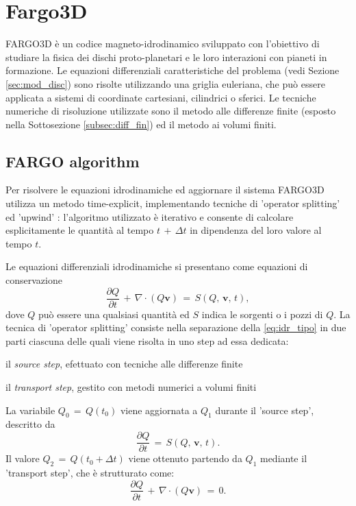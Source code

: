\section{Fargo3D}

FARGO3D è un codice magneto-idrodinamico sviluppato con l'obiettivo di studiare la fisica dei dischi proto-planetari e le loro interazioni con pianeti in formazione. Le equazioni differenziali caratteristiche del problema (vedi Sezione \ref{sec:mod_disc}) sono risolte utilizzando una griglia euleriana, che può essere applicata a sistemi di coordinate cartesiani, cilindrici o sferici. Le tecniche numeriche di risoluzione utilizzate sono il metodo alle differenze finite (esposto nella Sottosezione \ref{subsec:diff_fin}) ed il metodo ai volumi finiti.

\subsection{FARGO algorithm} \label{subsec:Fargo_al}

Per risolvere le equazioni idrodinamiche ed aggiornare il sistema FARGO3D utilizza un metodo time-explicit, implementando tecniche di 'operator splitting' ed 'upwind' \parencite{Fargo3D}: l'algoritmo utilizzato è iterativo e consente di calcolare esplicitamente le quantità al tempo $t\,+\,\Delta t$ in dipendenza del loro valore al tempo $t$.

Le equazioni differenziali idrodinamiche si presentano come equazioni di conservazione
\begin{equation}
\frac{\partial Q}{\partial t}\,+\,\nabla \cdot (Q\mathbf{v})\,=\,S(Q,\,\mathbf{v},\,t),
\label{eq:idr_tipo}
\end{equation}
dove $Q$ può essere una qualsiasi quantità ed $S$ indica le sorgenti o i pozzi di $Q$.
La tecnica di 'operator splitting' consiste nella separazione della \eqref{eq:idr_tipo} in due parti ciascuna delle quali viene risolta in uno step ad essa dedicata:
\begin{list}{\textbf{-}}{\setlength{\itemsep}{0cm}}
    \item il \textit{source step}, efettuato con tecniche alle differenze finite
    \item il \textit{transport step}, gestito con metodi numerici a volumi finiti
\end{list}
La variabile $Q_0\,=\,Q(t_0)$ viene aggiornata a $Q_1$ durante il 'source step', descritto da
\begin{equation}
\frac{\partial Q}{\partial t}\,=\,S(Q,\,\mathbf{v},\,t).
\label{eq:source_step}
\end{equation}
Il valore $Q_2\,=\,Q(t_0+\Delta t)$ viene ottenuto partendo da $Q_1$ mediante il 'transport step', che è strutturato come:
\begin{equation}
\frac{\partial Q}{\partial t}\,+\,\nabla \cdot (Q\mathbf{v})\,=\,0.
\label{eq:transport_step}
\end{equation}

